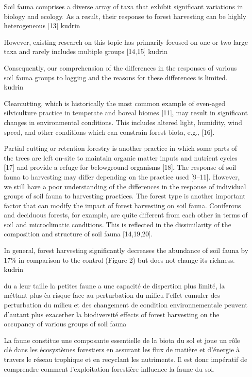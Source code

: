 Soil fauna comprises a diverse array of taxa that exhibit significant variations in biology and ecology. As a result, their response to forest harvesting can be highly heterogeneous [13] kudrin

However, existing research on this topic has primarily focused on one or two large taxa and rarely includes multiple groups [14,15] kudrin

Consequently, our comprehension of the differences in the responses of various soil fauna groups to logging and the reasons for these differences is limited. kudrin

Clearcutting, which is historically the most common example of even-aged silviculture practice in temperate and boreal biomes [11], may result in significant changes in environmental conditions. This includes altered light, humidity, wind speed, and other conditions which can constrain forest biota, e.g., [16].

Partial cutting or retention forestry is another practice in which some parts of the trees are left on-site to maintain organic matter inputs and nutrient cycles [17] and provide a refuge for belowground organisms [18]. The response of soil fauna to harvesting may differ depending on the practice used [9–11]. However, we still have a poor understanding of the differences in the response of individual groups of soil fauna to harvesting practices. The forest type is another important factor that can modify the impact of forest harvesting on soil fauna. Coniferous and deciduous forests, for example, are quite different from each other in terms of soil and microclimatic conditions. This is reflected in the dissimilarity of the composition and structure of soil fauna [14,19,20].

In general, forest harvesting significantly decreases the abundance of soil fauna by 17\% in comparison to the control (Figure 2) but does not change its richness. kudrin

du a leur taille la petites faune a une capacité de dispertion plus limité, la méttant plus èa risque face au perturbation du milieu
l'effet cumuler des perturbation du milieu et des changement de condition environnementale peuvent d'autant plus exacerber la biodiversité
 effects of forest harvesting on the occupancy of various groups of soil fauna

La faune constitue une composante essentielle de la biota du sol et joue un rôle clé dans les écosystèmes forestiers en assurant les flux de matière et d'énergie à travers le réseau trophique et en recyclant les nutriments. 
Il est donc impératif de comprendre comment l'exploitation forestière influence la faune du sol.

